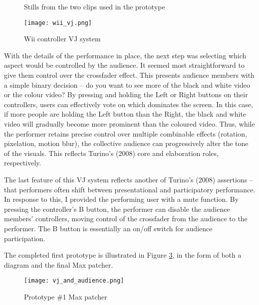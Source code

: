 \begin{figure}[t]
	\centering

	\hspace{0.1cm}
	\caption{Stills from the two clips used in the prototype}

	\label{prototyping1.3}
\end{figure}

\begin{figure}[t]
	\centering

	\texttt{[image: wii\_vj.png]}
	\caption{Wii controller VJ system}

	\label{prototyping1.4}
\end{figure}

With the details of the performance in place, the next step was selecting which aspect would be controlled by the audience. It seemed most straightforward to give them control over the crossfader effect. This presents audience members with a simple binary decision -- do you want to see more of the black and white video or the colour video? By pressing and holding the Left or Right buttons on their controllers, users can effectively vote on which dominates the screen. In this case, if more people are holding the Left button than the Right, the black and white video will gradually become more prominent than the coloured video. Thus, while the performer retains precise control over multiple combinable effects (rotation, pixelation, motion blur), the collective audience can progressively alter the tone of the visuals. This reflects Turino's (2008) core and elaboration roles, respectively.

The last feature of this VJ system reflects another of Turino's (2008) assertions -- that performers often shift between presentational and participatory performance. In response to this, I provided the performing user with a mute function. By pressing the controller's B button, the performer can disable the audience members' controllers, moving control of the crossfader from the audience to the performer. The B button is essentially an on/off switch for audience participation.

The completed first prototype is illustrated in Figure \ref{prototyping1.5}, in the form of both a diagram and the final Max patcher.

\begin{figure}[t]
	\centering

	\texttt{[image: vj\_and\_audience.png]}
	\caption{Prototype \#1 Max patcher}

	\label{prototyping1.5}
\end{figure}

